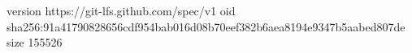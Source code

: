 version https://git-lfs.github.com/spec/v1
oid sha256:91a41790828656cdf954bab016d08b70eef382b6aea8194e9347b5aabed807de
size 155526
